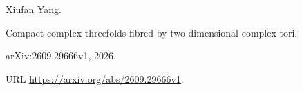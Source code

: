 Xiufan Yang.

\newblock Compact complex threefolds fibred by two-dimensional complex tori.

\newblock arXiv:2609.29666v1, 2026.

\newblock URL \url{https://arxiv.org/abs/2609.29666v1}.
